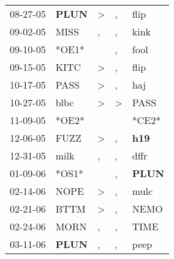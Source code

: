 \begin{supertabular}{p{0.07\textwidth}p{0.06\textwidth}p{0.02\textwidth}p{0.02\textwidth}p{0.06\textwidth}}
          08-27-05\textsuperscript{} &  \textbf{PLUN\textsuperscript{}} &     \textgreater &                , &           flip\textsuperscript{} \\
          09-02-05\textsuperscript{} &           MISS\textsuperscript{} &                , &                , &           kink\textsuperscript{} \\
          09-10-05\textsuperscript{} &                            *OE1* &                  &                , &           fool\textsuperscript{} \\
          09-15-05\textsuperscript{} &           KITC\textsuperscript{} &     \textgreater &                , &           flip\textsuperscript{} \\
          10-17-05\textsuperscript{} &           PASS\textsuperscript{} &     \textgreater &                , &            haj\textsuperscript{} \\
          10-27-05\textsuperscript{} &           blbc\textsuperscript{} &     \textgreater &     \textgreater &           PASS\textsuperscript{} \\
          11-09-05\textsuperscript{} &                            *OE2* &                  &                  &                            *CE2* \\
          12-06-05\textsuperscript{} &           FUZZ\textsuperscript{} &     \textgreater &                , &   \textbf{h19\textsuperscript{}} \\
          12-31-05\textsuperscript{} &           milk\textsuperscript{} &                , &                , &           dffr\textsuperscript{} \\
          01-09-06\textsuperscript{} &                            *OS1* &                  &                , &  \textbf{PLUN\textsuperscript{}} \\
          02-14-06\textsuperscript{} &           NOPE\textsuperscript{} &     \textgreater &                , &           mulc\textsuperscript{} \\
          02-21-06\textsuperscript{} &           BTTM\textsuperscript{} &     \textgreater &                , &           NEMO\textsuperscript{} \\
          02-24-06\textsuperscript{} &           MORN\textsuperscript{} &                , &                , &           TIME\textsuperscript{} \\
          03-11-06\textsuperscript{} &  \textbf{PLUN\textsuperscript{}} &                , &                , &           peep\textsuperscript{} \\

\end{supertabular}
